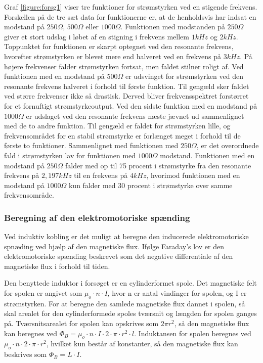 Graf \ref{figure:forsg1} viser tre funktioner for strømstyrken ved en stigende frekvens. Forskellen på de tre sæt data for funktionerne er, at de henholdsvis har indsat en modstand på $250 \Omega$, $500 \Omega$ eller $1000 \Omega$. Funktionen med modstanden på $250 \Omega$ giver et stort udslag i løbet af en stigning i frekvens mellem $1 kHz$ og $2 kHz$. Toppunktet for funktionen er skarpt optegnet ved den resonante frekvens, hvorefter strømstyrken er blevet mere end halveret ved en frekvens på $3 kHz$. På højere frekvenser falder strømstyrken fortsat, men faldet stilner roligt af. Ved funktionen med en modstand på $500 \Omega$ er udsvinget for strømstyrken ved den resonante frekvens halveret i forhold til første funktion. Til gengæld sker faldet ved større frekvenser ikke så drastisk. Derved bliver frekvensspektret forstørret for et fornuftigt strømstyrkeoutput. Ved den sidste funktion med en modstand på $1000 \Omega$ er udslaget ved den resonante frekvens næste jævnet ud sammenlignet med de to andre funktion. Til gengæld er faldet for strømstyrken lille, og frekvensområdet for en stabil strømstyrke er forlænget meget i forhold til de første to funktioner. Sammenlignet med funktionen med $250 \Omega$, er det overordnede fald i strømstyrken lav for funktionen med $1000 \Omega$ modstand. Funktionen med en modstand på $250 \Omega$ falder med op til 75 procent i strømstyrke fra den resonante frekvens på $2,197 kHz$ til en frekvens på $4 kHz$, hvorimod funktionen med en modstand på $1000 \Omega$ kun falder med 30 procent i strømstyrke over samme frekvensområde.

\subsubsection{Beregning af den elektromotoriske spænding}

Ved induktiv kobling er det muligt at beregne den inducerede elektromotoriske spnæding ved hjælp af den magnetiske flux. Ifølge Faraday's lov er den elektromotoriske spænding beskrevet som det negative differentiale af den magnetiske flux i forhold til tiden.

Den benyttede induktor i forsøget er en cylinderformet spole. Det magnetiske felt for spolen er angivet som $\mu_o \cdot n \cdot I$, hvor n er antal vindinger for spolen, og I er strømstyrken. For at beregne den samlede magnetiske flux dannet i spolen, så skal arealet for den cylinderformede spoles tværsnit og længden for spolen ganges på. Tværsnitsarealet for spolen kan opskrives som $2 \pi r^2$, så den magnetiske flux kan beregnes ved $\Phi_B = \mu_o \cdot n \cdot I \cdot 2 \cdot \pi \cdot r^2 \cdot l$. Induktansen for spolen beregnes ved $\mu_o \cdot n \cdot 2 \cdot \pi \cdot r^2$, hvilket kun består af konstanter, så den magnetiske flux kan beskrives som $\Phi_B = L \cdot I$.

